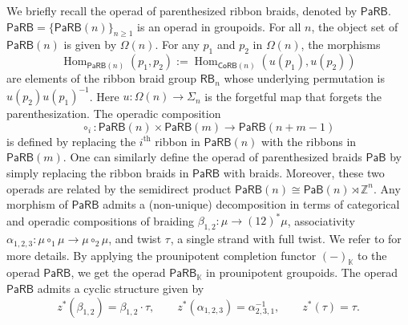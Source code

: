 \documentclass{amsart}
\newcommand{\kk}{\mathbb{K}}    %
\newcommand{\CoRB}{\mathsf{CoRB}}
\newcommand{\PaRB}{\mathsf{PaRB}}
\newcommand{\magma}{\Omega}
\newcommand{\PaB}{\mathsf{PaB}}
\newcommand{\Hom}{\operatorname{Hom}}
\newcommand{\lrar}{\ensuremath{\longrightarrow}}
\newcommand{\RB}{\mathsf{RB}} %
\theoremstyle{definition}
\numberwithin{equation}{section}
\begin{document}
We briefly recall the operad of parenthesized ribbon braids, denoted by $\PaRB$. $\PaRB = \{\PaRB(n)\}_{n \geq 1}$ is an operad in groupoids. For all $n$, the object set of $\PaRB(n)$ is given by $\magma(n)$. For any $p_1$ and $p_2$ in $\magma(n)$, the morphisms $$\Hom_{\PaRB(n)}(p_1,p_2) := \Hom_{\CoRB(n)}(u(p_1),u(p_2))$$ are elements of the ribbon braid group $\RB_n$ whose underlying permutation is $u(p_2)u(p_1)^{-1}$. Here $u : \magma(n) \lrar \Sigma_n$ is the forgetful map that forgets the parenthesization. The operadic composition \[\circ_i: \PaRB(n) \times \PaRB(m) \lrar \PaRB(n+m -1)\] is defined by replacing the $i^{\text{th}}$ ribbon in $\PaRB(n)$ with the ribbons in $\PaRB(m)$. One can similarly define the operad of parenthesized braids $\PaB$ by simply replacing the ribbon braids in $\PaRB$ with braids. Moreover, these two operads are related by the semidirect product $\PaRB(n) \cong \PaB(n) \rtimes \mathbb{Z}^{n}$. Any morphism of $\PaRB$ admits a (non-unique) decomposition in terms of categorical and operadic compositions of braiding $\beta_{1,2}: \mu \lrar (12)^* \mu$, associativity $\alpha_{1,2,3}: \mu \circ_1 \mu \lrar \mu \circ_2 
\mu$, and twist $\tau_{}$, a single strand with full twist. We refer to \cite[Section~6]{Boavida-Horel-Robertson} for more details. By applying the prounipotent completion functor $(-)_{\kk}$ to the operad $\PaRB$, we get the operad $\PaRB_{\kk}$ in prounipotent groupoids. The operad $\PaRB$ admits a cyclic structure \cite{campos2019configuration, RS2025cyclicgt} given by 
\[z^*(\beta_{1,2}) = \beta_{1,2} \cdot \tau, \qquad z^* (\alpha_{1,2,3}) = \alpha^{-1}_{2,3,1}, \qquad z^*(\tau) = \tau.\]

\end{document}
